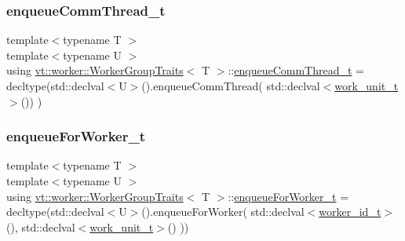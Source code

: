\mbox{\label{structvt_1_1worker_1_1_worker_group_traits_a576f8d9a2343be8a876df90d1eb9c955}} 
\subsubsection{\texorpdfstring{enqueue\+Comm\+Thread\+\_\+t}{enqueueCommThread\_t}}
{\footnotesize\ttfamily template$<$typename T $>$ \\
template$<$typename U $>$ \\
using \hyperlink{structvt_1_1worker_1_1_worker_group_traits}{vt\+::worker\+::\+Worker\+Group\+Traits}$<$ T $>$\+::\hyperlink{structvt_1_1worker_1_1_worker_group_traits_a576f8d9a2343be8a876df90d1eb9c955}{enqueue\+Comm\+Thread\+\_\+t} =  decltype(std\+::declval$<$U$>$().enqueue\+Comm\+Thread( std\+::declval$<$\hyperlink{structvt_1_1worker_1_1_worker_group_traits_ae7c108d04180f59f3e2cd4fa065be4b0}{work\+\_\+unit\+\_\+t}$>$()) )}

\mbox{\label{structvt_1_1worker_1_1_worker_group_traits_abc65803c8886a88507e51c0798fe38a7}} 
\subsubsection{\texorpdfstring{enqueue\+For\+Worker\+\_\+t}{enqueueForWorker\_t}}
{\footnotesize\ttfamily template$<$typename T $>$ \\
template$<$typename U $>$ \\
using \hyperlink{structvt_1_1worker_1_1_worker_group_traits}{vt\+::worker\+::\+Worker\+Group\+Traits}$<$ T $>$\+::\hyperlink{structvt_1_1worker_1_1_worker_group_traits_abc65803c8886a88507e51c0798fe38a7}{enqueue\+For\+Worker\+\_\+t} =  decltype(std\+::declval$<$U$>$().enqueue\+For\+Worker( std\+::declval$<$\hyperlink{structvt_1_1worker_1_1_worker_group_traits_a227b8add8f3fae6004adc05d5e85204f}{worker\+\_\+id\+\_\+t}$>$(), std\+::declval$<$\hyperlink{structvt_1_1worker_1_1_worker_group_traits_ae7c108d04180f59f3e2cd4fa065be4b0}{work\+\_\+unit\+\_\+t}$>$() ))}


